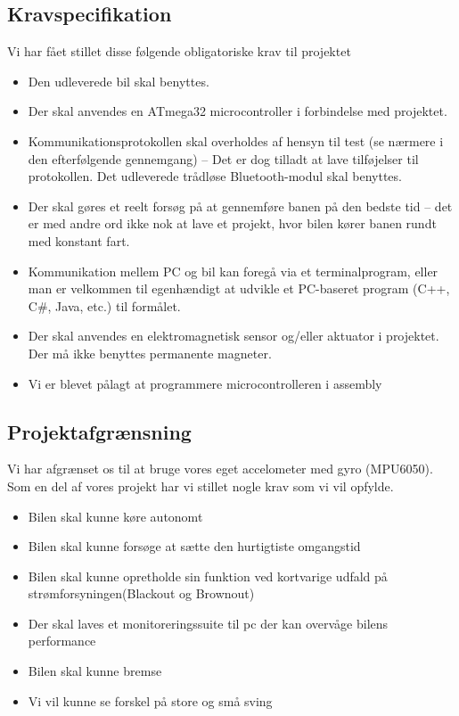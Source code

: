 \subsection{Kravspecifikation}

Vi har fået stillet disse følgende obligatoriske krav til projektet

\begin{itemize}
	\item Den udleverede bil skal benyttes.
	\item Der skal anvendes en ATmega32 microcontroller i forbindelse med projektet.
	\item Kommunikationsprotokollen skal overholdes af hensyn til test (se nærmere i den efterfølgende gennemgang) – Det er dog tilladt at lave tilføjelser til protokollen. Det udleverede trådløse Bluetooth-modul skal benyttes.
	\item Der skal gøres et reelt forsøg på at gennemføre banen på den bedste tid – det er med andre ord ikke nok at lave et projekt, hvor bilen kører banen rundt med konstant fart.
	\item Kommunikation mellem PC og bil kan foregå via et terminalprogram, eller man er velkommen til egenhændigt at udvikle et PC-baseret program (C++, C\#, Java, etc.) til formålet.
	\item Der skal anvendes en elektromagnetisk sensor og/eller aktuator i projektet. Der må ikke benyttes permanente magneter.
	\item Vi er blevet pålagt at programmere microcontrolleren i assembly
\end{itemize}


\subsection{Projektafgrænsning}

Vi har afgrænset os til at bruge vores eget accelometer med gyro (MPU6050).
Som en del af vores projekt har vi stillet nogle krav som vi vil opfylde.

\begin{itemize}
	\item Bilen skal kunne køre autonomt
	\item Bilen skal kunne forsøge at sætte den hurtigtiste omgangstid
	\item Bilen skal kunne opretholde sin funktion ved kortvarige udfald på strømforsyningen(Blackout og Brownout)
	\item Der skal laves et monitoreringssuite til pc der kan overvåge bilens performance
	\item Bilen skal kunne bremse
	\item Vi vil kunne se forskel på store og små sving
\end{itemize}

